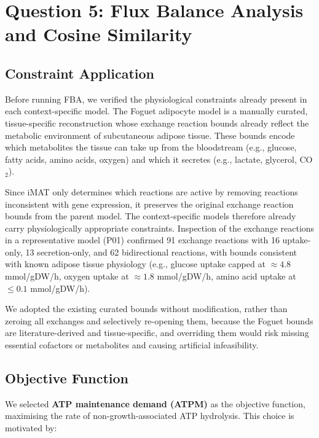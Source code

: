 \documentclass[11pt, a4paper]{article}
\begin{document}
\section{Question 5: Flux Balance Analysis and Cosine Similarity}
\label{sec:q5}

\subsection{Constraint Application}

Before running FBA, we verified the physiological constraints already present in each context-specific model. The Foguet adipocyte model is a manually curated, tissue-specific reconstruction whose exchange reaction bounds already reflect the metabolic environment of subcutaneous adipose tissue. These bounds encode which metabolites the tissue can take up from the bloodstream (e.g., glucose, fatty acids, amino acids, oxygen) and which it secretes (e.g., lactate, glycerol, CO$_2$).

Since iMAT only determines which reactions are active by removing reactions inconsistent with gene expression, it preserves the original exchange reaction bounds from the parent model. The context-specific models therefore already carry physiologically appropriate constraints. Inspection of the exchange reactions in a representative model (P01) confirmed 91 exchange reactions with 16 uptake-only, 13 secretion-only, and 62 bidirectional reactions, with bounds consistent with known adipose tissue physiology (e.g., glucose uptake capped at $\approx 4.8$ mmol/gDW/h, oxygen uptake at $\approx 1.8$ mmol/gDW/h, amino acid uptake at $\leq 0.1$ mmol/gDW/h).

We adopted the existing curated bounds without modification, rather than zeroing all exchanges and selectively re-opening them, because the Foguet bounds are literature-derived and tissue-specific, and overriding them would risk missing essential cofactors or metabolites and causing artificial infeasibility.

\subsection{Objective Function}

We selected \textbf{ATP maintenance demand (ATPM)} as the objective function, maximising the rate of non-growth-associated ATP hydrolysis. This choice is motivated by:
\end{document}
